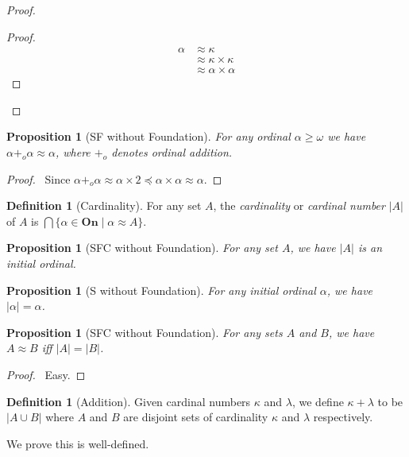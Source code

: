 \documentclass{book}
\let\qed\relax
\newtheorem{prop}[ax]{Proposition}
\theoremstyle{definition}
\newtheorem{df}[ax]{Definition}
\begin{document}
\begin{proof}
\pf
{}
\begin{proof}
	\pf
	\begin{align*}
		\alpha & \approx \kappa \\
		& \approx \kappa \times \kappa \\
		& \approx \alpha \times \alpha
	\end{align*}
\end{proof}
\qed
\end{proof}

\begin{prop}[SF without Foundation]
\label{prop:alpha_plus_alpha_approx_alpha}
For any ordinal $\alpha \geq \omega$ we have $\alpha +_o \alpha \approx \alpha$, where $+_o$ denotes ordinal addition.
\end{prop}

\begin{proof}
\pf\ Since $\alpha +_o \alpha \approx \alpha \times 2 \preccurlyeq \alpha \times \alpha \approx \alpha$. \qed
\end{proof}

\begin{df}[Cardinality]
For any set $A$, the \emph{cardinality} or \emph{cardinal number} $|A|$ of $A$ is $\bigcap \{ \alpha \in \mathbf{On} \mid \alpha \approx A \}$.
\end{df}

\begin{prop}[SFC without Foundation]
For any set $A$, we have $|A|$ is an initial ordinal.
\end{prop}

\begin{prop}[S without Foundation]
For any initial ordinal $\alpha$, we have $|\alpha| = \alpha$.
\end{prop}

\begin{prop}[SFC without Foundation]
For any sets $A$ and $B$, we have $A \approx B$ iff $|A| = |B|$.
\end{prop}

\begin{proof}
\pf\ Easy. \qed
\end{proof}

\begin{df}[Addition]
Given cardinal numbers $\kappa$ and $\lambda$, we define $\kappa + \lambda$ to be $|A \cup B|$ where $A$ and $B$ are disjoint sets of cardinality $\kappa$ and $\lambda$ respectively.

We prove this is well-defined.
\end{df}
\end{document}
